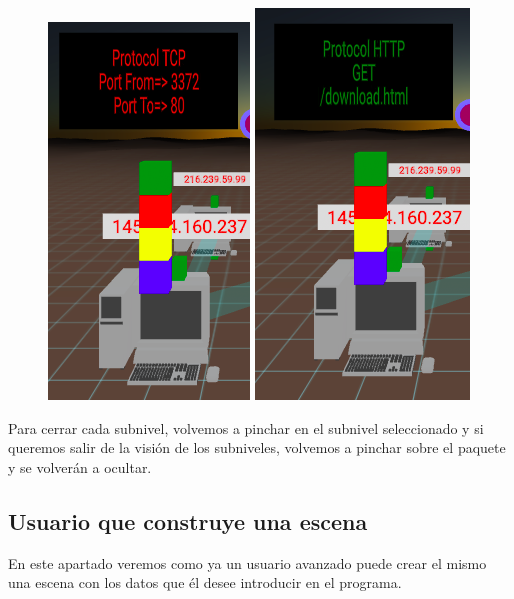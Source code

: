 \documentclass[a4paper, 12pt]{book}
\begin{document}
\begin{figure}[h]
    \includegraphics[scale=0.45]{img/capa_tcp.png}
    \includegraphics[scale=0.44]{img/capa_http4.png}
\end{figure}

Para cerrar cada subnivel, volvemos a pinchar en el subnivel seleccionado y si queremos salir de la visión de los subniveles, volvemos a pinchar sobre el paquete y se volverán a ocultar.

\subsection{Usuario que construye una escena}

En este apartado veremos como ya un usuario avanzado puede  crear el mismo una escena con los datos que él desee introducir en el programa.
\end{document}
